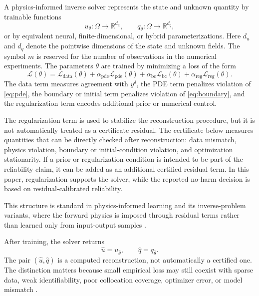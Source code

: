 \documentclass{article}
\numberwithin{equation}{section}
\theoremstyle{definition}
\begin{document}
A physics-informed inverse solver represents the state and unknown quantity by trainable functions
\begin{equation}
u_\theta:\Omega\to\mathbb R^{d_u},
\qquad
q_\theta:\Omega\to\mathbb R^{d_q},
\label{eq:neural-state-parameter}
\end{equation}
or by equivalent neural, finite-dimensional, or hybrid parameterizations. Here \(d_u\) and \(d_q\) denote the pointwise dimensions of the state and unknown fields. The symbol \(m\) is reserved for the number of observations in the numerical experiments. The parameters \(\theta\) are trained by minimizing a loss of the form
\begin{equation}
\mathcal L(\theta)
=
\mathcal L_{\mathrm{data}}(\theta)
+
\alpha_{\mathrm{pde}}\mathcal L_{\mathrm{pde}}(\theta)
+
\alpha_{\mathrm{bc}}\mathcal L_{\mathrm{bc}}(\theta)
+
\alpha_{\mathrm{reg}}\mathcal L_{\mathrm{reg}}(\theta).
\label{eq:pinn-loss}
\end{equation}
The data term measures agreement with \(y^\delta\), the PDE term penalizes violation of \eqref{eq:pde}, the boundary or initial term penalizes violation of \eqref{eq:boundary}, and the regularization term encodes additional prior or numerical control.

The regularization term is used to stabilize the reconstruction procedure, but it is not automatically treated as a certificate residual. The certificate below measures quantities that can be directly checked after reconstruction: data mismatch, physics violation, boundary or initial-condition violation, and optimization stationarity. If a prior or regularization condition is intended to be part of the reliability claim, it can be added as an additional certified residual term. In this paper, regularization supports the solver, while the reported no-harm decision is based on residual-calibrated reliability.

This structure is standard in physics-informed learning and its inverse-problem variants, where the forward physics is imposed through residual terms rather than learned only from input-output samples \cite{RaissiPerdikarisKarniadakis2019,KarniadakisKevrekidisLuPerdikarisWangYang2021}.

After training, the solver returns
\begin{equation}
\widehat u=u_{\widehat\theta},
\qquad
\widehat q=q_{\widehat\theta}.
\label{eq:learned-output}
\end{equation}
The pair \((\widehat u,\widehat q)\) is a computed reconstruction, not automatically a certified one. The distinction matters because small empirical loss may still coexist with sparse data, weak identifiability, poor collocation coverage, optimizer error, or model mismatch \cite{AntunRennaPoonAdcockHansen2020,CuomoDiColaGiampaoloRozzaRaissiPiccialli2022}.
\end{document}
